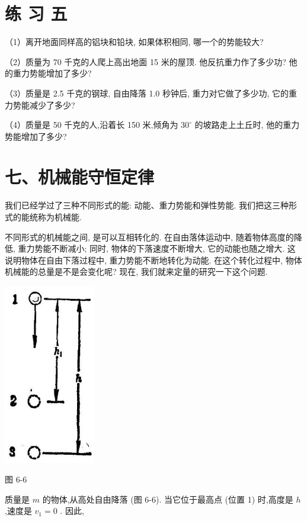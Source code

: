 \documentclass[10pt]{article}
\begin{document}
\section*{练 习 五}

（1）离开地面同样高的铝块和铅块, 如果体积相同, 哪一个的势能较大?

（2）质量为 70 千克的人爬上高出地面 15 米的屋顶. 他反抗重力作了多少功? 他的重力势能增加了多少?

（3）质量是 2.5 千克的钢球, 自由降落 1.0 秒钟后, 重力对它做了多少功, 它的重力势能减少了多少?

（4）质量是 50 千克的人,沿着长 150 米,倾角为 \({30}^{ \circ }\) 的坡路走上土丘时, 他的重力势能增加了多少?

\section*{七、机械能守恒定律}

我们已经学过了三种不同形式的能: 动能、重力势能和弹性势能. 我们把这三种形式的能统称为机械能.

不同形式的机械能之间, 是可以互相转化的. 在自由落体运动中, 随着物体高度的降低, 重力势能不断减小; 同时, 物体的下落速度不断增大, 它的动能也随之增大. 这说明物体在自由下落过程中, 重力势能不断地转化为动能. 在这个转化过程中, 物体机械能的总量是不是会变化呢? 现在, 我们就来定量的研究一下这个问题.

\begin{center}
\includegraphics[max width=0.3\textwidth]{images/01912d55-147c-70aa-b0e0-1782a122f948_180_332943.jpg}
\end{center}

图 6-6

质量是 \(m\) 的物体,从高处自由降落 (图 6-6). 当它位于最高点 (位置 1) 时,高度是 \(h\) ,速度是 \({v}_{1} = 0\) . 因此,
\end{document}

